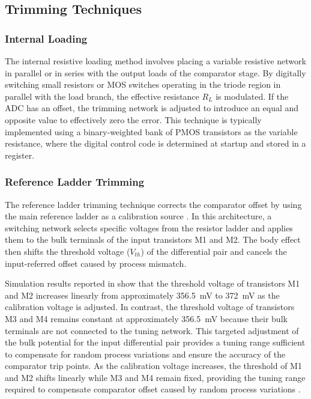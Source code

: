\subsection{Trimming Techniques}

\subsubsection{Internal Loading}
The internal resistive loading method involves placing a variable resistive network in parallel or in series with the output loads of the comparator stage. By digitally switching small resistors or MOS switches operating in the triode region in parallel with the load branch, the effective resistance $R_L$ is modulated. If the ADC has an offset, the trimming network is adjusted to introduce an equal and opposite value to effectively zero the error. This technique is typically implemented using a binary-weighted bank of PMOS transistors as the variable resistance, where the digital control code is determined at startup and stored in a register.

\subsubsection{Reference Ladder Trimming}
\label{subsec:ladder_trimming}

The reference ladder trimming technique corrects the comparator offset by using the main reference ladder as a calibration source \cite{yao_bulk_2011}. In this architecture, a switching network selects specific voltages from the resistor ladder and applies them to the bulk terminals of the input transistors M1 and M2. The body effect then shifts the threshold voltage ($V_{th}$) of the differential pair and cancels the input-referred offset caused by process mismatch.

Simulation results reported in \cite{yao_bulk_2011} show that the threshold voltage of transistors M1 and M2 increases linearly from approximately 356.5~mV to 372~mV as the calibration voltage is adjusted. In contrast, the threshold voltage of transistors M3 and M4 remains constant at approximately 356.5~mV because their bulk terminals are not connected to the tuning network. This targeted adjustment of the bulk potential for the input differential pair provides a tuning range sufficient to compensate for random process variations and ensure the accuracy of the comparator trip points. As the calibration voltage increases, the threshold of M1 and M2 shifts linearly while M3 and M4 remain fixed, providing the tuning range required to compensate comparator offset caused by random process variations \cite{yao_bulk_2011}.

